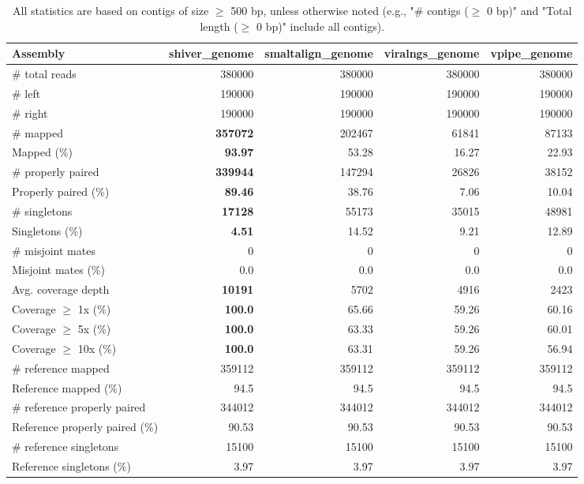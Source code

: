 \documentclass[12pt,a4paper]{article}
\begin{document}
\begin{table}[ht]
\begin{center}
\caption{All statistics are based on contigs of size $\geq$ 500 bp, unless otherwise noted (e.g., "\# contigs ($\geq$ 0 bp)" and "Total length ($\geq$ 0 bp)" include all contigs).}
\begin{tabular}{|l*{4}{|r}|}
\hline
Assembly & shiver\_genome & smaltalign\_genome & viralngs\_genome & vpipe\_genome \\ \hline
\# total reads & 380000 & 380000 & 380000 & 380000 \\ \hline
\# left & 190000 & 190000 & 190000 & 190000 \\ \hline
\# right & 190000 & 190000 & 190000 & 190000 \\ \hline
\# mapped & {\bf 357072} & 202467 & 61841 & 87133 \\ \hline
Mapped (\%) & {\bf 93.97} & 53.28 & 16.27 & 22.93 \\ \hline
\# properly paired & {\bf 339944} & 147294 & 26826 & 38152 \\ \hline
Properly paired (\%) & {\bf 89.46} & 38.76 & 7.06 & 10.04 \\ \hline
\# singletons & {\bf 17128} & 55173 & 35015 & 48981 \\ \hline
Singletons (\%) & {\bf 4.51} & 14.52 & 9.21 & 12.89 \\ \hline
\# misjoint mates & 0 & 0 & 0 & 0 \\ \hline
Misjoint mates (\%) & 0.0 & 0.0 & 0.0 & 0.0 \\ \hline
Avg. coverage depth & {\bf 10191} & 5702 & 4916 & 2423 \\ \hline
Coverage $\geq$ 1x (\%) & {\bf 100.0} & 65.66 & 59.26 & 60.16 \\ \hline
Coverage $\geq$ 5x (\%) & {\bf 100.0} & 63.33 & 59.26 & 60.01 \\ \hline
Coverage $\geq$ 10x (\%) & {\bf 100.0} & 63.31 & 59.26 & 56.94 \\ \hline
\# reference mapped & 359112 & 359112 & 359112 & 359112 \\ \hline
Reference mapped (\%) & 94.5 & 94.5 & 94.5 & 94.5 \\ \hline
\# reference properly paired & 344012 & 344012 & 344012 & 344012 \\ \hline
Reference properly paired (\%) & 90.53 & 90.53 & 90.53 & 90.53 \\ \hline
\# reference singletons & 15100 & 15100 & 15100 & 15100 \\ \hline
Reference singletons (\%) & 3.97 & 3.97 & 3.97 & 3.97 \\ \hline

\end{tabular}
\end{center}
\end{table}
\end{document}
